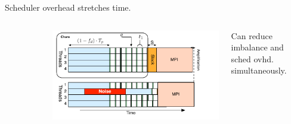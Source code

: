 {\begin{frame}[label=hybridstatdyn]
\begin{columns}
\begin{center}
  \end{center}
\vspace*{-0.3in}
\begin{center}
{\tiny Scheduler overhead stretches time.}
\end{center}
\end{columns}
\begin{columns}
\vspace*{-0.1in}
\begin{figure} 

\end{figure}
\begin{center}
\includegraphics[scale=0.31]{./images/threadedCompRegion-hybrid}
\end{center}
\vspace*{-0.3in}
\begin{center}
{\tiny Can reduce imbalance and sched ovhd. simultaneously.}
\end{center}
\end{columns}
\end{frame}


}
